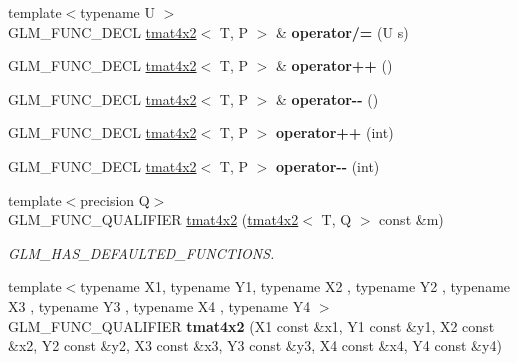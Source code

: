 \begin{DoxyCompactItemize}
\item 
\hypertarget{structglm_1_1tmat4x2_a249db7437c8109b32811b84b543d97a5}{{\footnotesize template$<$typename U $>$ }\\G\-L\-M\-\_\-\-F\-U\-N\-C\-\_\-\-D\-E\-C\-L \hyperlink{structglm_1_1tmat4x2}{tmat4x2}$<$ T, P $>$ \& {\bfseries operator/=} (U s)}\label{structglm_1_1tmat4x2_a249db7437c8109b32811b84b543d97a5}

\item 
\hypertarget{structglm_1_1tmat4x2_aa4dfd99c24f9e86e7b3de9c0a2cb99ab}{G\-L\-M\-\_\-\-F\-U\-N\-C\-\_\-\-D\-E\-C\-L \hyperlink{structglm_1_1tmat4x2}{tmat4x2}$<$ T, P $>$ \& {\bfseries operator++} ()}\label{structglm_1_1tmat4x2_aa4dfd99c24f9e86e7b3de9c0a2cb99ab}

\item 
\hypertarget{structglm_1_1tmat4x2_acb22e08a3abe9442d718346508b76681}{G\-L\-M\-\_\-\-F\-U\-N\-C\-\_\-\-D\-E\-C\-L \hyperlink{structglm_1_1tmat4x2}{tmat4x2}$<$ T, P $>$ \& {\bfseries operator-\/-\/} ()}\label{structglm_1_1tmat4x2_acb22e08a3abe9442d718346508b76681}

\item 
\hypertarget{structglm_1_1tmat4x2_af0211253087f7df4afb95aeba8daef24}{G\-L\-M\-\_\-\-F\-U\-N\-C\-\_\-\-D\-E\-C\-L \hyperlink{structglm_1_1tmat4x2}{tmat4x2}$<$ T, P $>$ {\bfseries operator++} (int)}\label{structglm_1_1tmat4x2_af0211253087f7df4afb95aeba8daef24}

\item 
\hypertarget{structglm_1_1tmat4x2_a6e82215ef61cf4f3b4a1cf3bfe21d6fc}{G\-L\-M\-\_\-\-F\-U\-N\-C\-\_\-\-D\-E\-C\-L \hyperlink{structglm_1_1tmat4x2}{tmat4x2}$<$ T, P $>$ {\bfseries operator-\/-\/} (int)}\label{structglm_1_1tmat4x2_a6e82215ef61cf4f3b4a1cf3bfe21d6fc}

\item 
\hypertarget{structglm_1_1tmat4x2_aabba725bdf197091f8eab5a583201fca}{{\footnotesize template$<$precision Q$>$ }\\G\-L\-M\-\_\-\-F\-U\-N\-C\-\_\-\-Q\-U\-A\-L\-I\-F\-I\-E\-R \hyperlink{structglm_1_1tmat4x2_aabba725bdf197091f8eab5a583201fca}{tmat4x2} (\hyperlink{structglm_1_1tmat4x2}{tmat4x2}$<$ T, Q $>$ const \&m)}\label{structglm_1_1tmat4x2_aabba725bdf197091f8eab5a583201fca}

\begin{DoxyCompactList}\small\item\em G\-L\-M\-\_\-\-H\-A\-S\-\_\-\-D\-E\-F\-A\-U\-L\-T\-E\-D\-\_\-\-F\-U\-N\-C\-T\-I\-O\-N\-S. \end{DoxyCompactList}\item 
\hypertarget{structglm_1_1tmat4x2_a063ba1a4bae85b2260fa636d3081fdfb}{{\footnotesize template$<$typename X1, typename Y1, typename X2 , typename Y2 , typename X3 , typename Y3 , typename X4 , typename Y4 $>$ }\\G\-L\-M\-\_\-\-F\-U\-N\-C\-\_\-\-Q\-U\-A\-L\-I\-F\-I\-E\-R {\bfseries tmat4x2} (X1 const \&x1, Y1 const \&y1, X2 const \&x2, Y2 const \&y2, X3 const \&x3, Y3 const \&y3, X4 const \&x4, Y4 const \&y4)}\label{structglm_1_1tmat4x2_a063ba1a4bae85b2260fa636d3081fdfb}


\end{DoxyCompactItemize}
